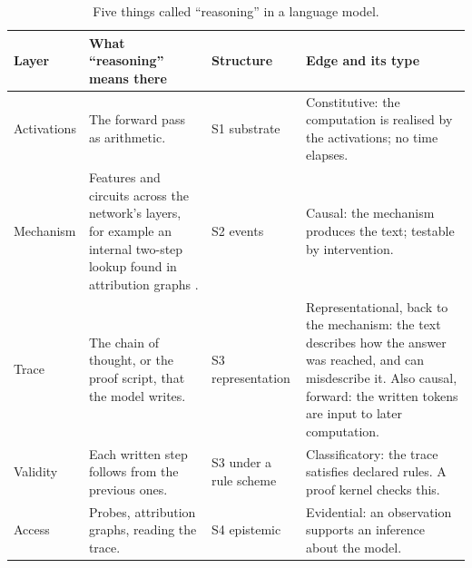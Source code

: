 \begin{table}[t]
\centering\small
\begin{tabularx}{\textwidth}{@{}P{1.8cm}P{5.2cm}P{2.4cm}L@{}}
\toprule
Layer & What ``reasoning'' means there & Structure & Edge and its type \\
\midrule
Activations &
  The forward pass as arithmetic. &
  S1 substrate &
  Constitutive: the computation is realised by the activations; no time elapses. \\
Mechanism &
  Features and circuits across the network's layers, for example an internal two-step
  lookup found in attribution graphs \citep{lindsey2025}. &
  S2 events &
  Causal: the mechanism produces the text; testable by intervention. \\
Trace &
  The chain of thought, or the proof script, that the model writes. &
  S3 representation &
  Representational, back to the mechanism: the text describes how the answer was
  reached, and can misdescribe it. Also causal, forward: the written tokens are input
  to later computation. \\
Validity &
  Each written step follows from the previous ones. &
  S3 under a rule scheme &
  Classificatory: the trace satisfies declared rules. A proof kernel checks this. \\
Access &
  Probes, attribution graphs, reading the trace. &
  S4 epistemic &
  Evidential: an observation supports an inference about the model. \\
\bottomrule
\end{tabularx}
\caption{Five things called ``reasoning'' in a language model.}
\label{tab:reasoning}
\end{table}

